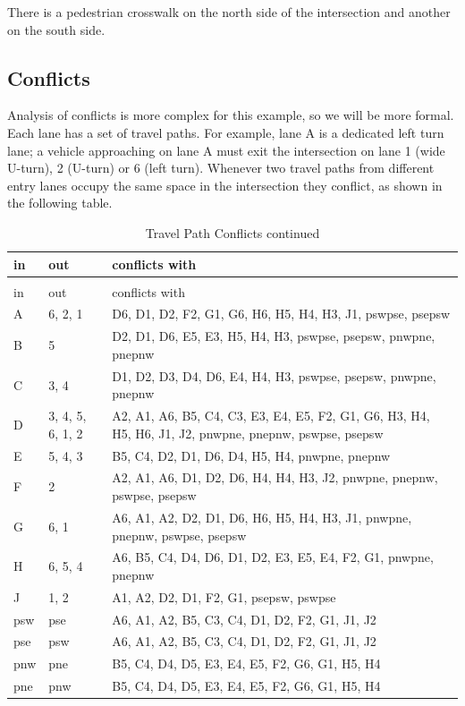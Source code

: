 \documentclass[letterpaper,twoside]{article}
\begin{document}
There is a pedestrian crosswalk on the north side of the intersection
and another on the south side.

\subsection{Conflicts}

Analysis of conflicts is more complex for this example, so we
will be more formal.  Each lane has a set of travel paths.
For example, lane A is a dedicated left turn lane; a vehicle approaching on
lane A must exit the intersection on lane 1 (wide U-turn), 2 (U-turn)
or 6 (left turn).  Whenever two travel paths from different entry lanes
occupy the same space in the intersection they conflict,
as shown in the following table.

\begin{longtable}{l | l | p{8cm}}
  \caption{Travel Path Conflicts} \\
  in & out & conflicts with \\ \hline \endfirsthead
  \caption{Travel Path Conflicts continued} \\
  in & out & conflicts with \\ \hline \endhead
  A & 6, 2, 1 & D6, D1, D2, F2, G1, G6, H6, H5, H4, H3, J1, pswpse, psepsw \\
  B & 5 & D2, D1, D6, E5, E3, H5, H4, H3, pswpse, psepsw, pnwpne, pnepnw \\
  C & 3, 4 & D1, D2, D3, D4, D6, E4, H4, H3, pswpse, psepsw, pnwpne, pnepnw \\
  D & 3, 4, 5, 6, 1, 2 & A2, A1, A6, B5, C4, C3, E3, E4, E5, F2, G1, G6, H3,
  H4, H5, H6, J1, J2, pnwpne, pnepnw, pswpse, psepsw \\
  E & 5, 4, 3 & B5, C4, D2, D1, D6, D4, H5, H4, pnwpne, pnepnw  \\
  F & 2 & A2, A1, A6, D1, D2, D6, H4, H4, H3, J2, pnwpne, pnepnw, pswpse,
  psepsw \\
  G & 6, 1 & A6, A1, A2, D2, D1, D6, H6, H5, H4, H3, J1, pnwpne, pnepnw,
  pswpse, psepsw \\
  H & 6, 5, 4 & A6, B5, C4, D4, D6, D1, D2, E3, E5, E4, F2, G1, pnwpne,
  pnepnw \\
  J & 1, 2 & A1, A2, D2, D1, F2, G1, psepsw, pswpse \\
  psw & pse & A6, A1, A2, B5, C3, C4, D1, D2, F2, G1, J1, J2 \\
  pse & psw & A6, A1, A2, B5, C3, C4, D1, D2, F2, G1, J1, J2 \\
  pnw & pne & B5, C4, D4, D5, E3, E4, E5, F2, G6, G1, H5, H4 \\
  pne & pnw & B5, C4, D4, D5, E3, E4, E5, F2, G6, G1, H5, H4 \\
\end{longtable}
\end{document}
